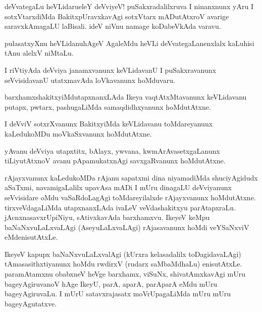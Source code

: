 \begin{mng}
deVvategaLu heVLidaru\mdash eleY deVviyeV! puSakxradalilxruva I ninanxnunx yAru I sotxVtarxdiMda BakitxpUravxkavAgi sotxVtarx mADutAtxroV avarige saravxkAmagaLU laBisali. ideV niVnu namage koDabeVkAda varavu.
\end{mng}

\begin{mng}
pulasatxyXnu heVLidanu\mdash hAgeV AgaleMdu heVLi deVvategaLanenxlalx kaLuhisi tAnu alelxV niMtaLu.
\end{mng}

\begin{mng}
I riVtiyAda deVviya janamxvanunx keVLidavanU I puSakxravanunx seVvisidavanU utatxmavAda loVkavanunx hoMduvaru.
\end{mng}

\begin{mng}
barxhamxshakitxyiMdutapxnanxLAda Ikeya vaqtAtxMtavanunx keVLidavanu putapx, pwtarx, pashugaLiMda samaqdidhxyanunx hoMdutAtxne.
\end{mng}

\begin{mng}
I deVviV sotxrXvanunx BakitxyiMda keVLidavanu toMdareyanunx kaLedukoMDu moVkaSxvanunx hoMdutAtxne.
\end{mng}

\begin{mng}
yAvanu deVviya utapxtitx, bAlayx, ywvana, kwmArAvasetxgaLanunx tiLiyutAtxnoV avanu pApamukatxnAgi savxgaRvanunx hoMdutAtxne.
\end{mng}

\begin{mng}
rAjayxvanunx kaLedukoMDa rAjanu sapatxmi dina niyamadiMda shuciyAgidudx aSaTxmi, navamigaLalilx upavAsa mADi I mUru dinagaLU deVviyanunx seVvisidare oMdu vaSaRdoLagAgi toMdareyilalxde rAjayxvanunx hoMdutAtxne. tirxveVdagaLiMda utapxnanxLAda ivaLeV veVdashakitxyu parAtapxraLu. jAcnxnasavxrUpiNiyu, sAtivxkavAda barxhamxvu. IkeyeV keMpu baNaNxvuLaLxvaLAgi (AseyuLaLxvaLAgi) rAjasavanunx hoMdi veYSaNxviV eMdenisutAtxLe.
\end{mng}

\begin{mng}
IkeyeV kapupx baNaNxvuLaLxvalAgi (kUrxra kelasadalilx toDagidavaLAgi) tAmasasithxtiyanunx hoMdu rwdirxV (rudarx saMbaMdhaLu) enisutAtxLe. paramAtamxnu obabxneV heVge barxhamx, viSuNx, shivatAmxkavAgi mUru bageyAgiruvanoV hAge IkeyU, parA, aparA, parAparA eMdu mUru bageyAgiruvaLu. I mUrU satavxrajasatx moVrUpagaLiMda mUru mUru bageyAgutatxve.
\end{mng}

